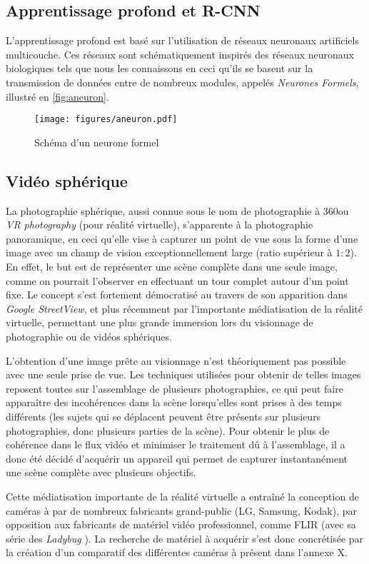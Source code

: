
		\subsection{Apprentissage profond et R-CNN}

			L'apprentissage profond est basé sur l'utilisation de réseaux neuronaux artificiels multicouche. Ces réseaux sont schématiquement inspirés des réseaux neuronaux biologiques tels que nous les connaissons en ceci qu'ils se basent sur la transmission de données entre de nombreux modules, appelés \emph{Neurones Formels}, illustré en \autoref{fig:aneuron}.
			\begin{figure}[h]
			{
				\centering
				\texttt{[image: figures/aneuron.pdf]}
				\caption{Schéma d'un neurone formel}
				\label{fig:aneuron}
			}
			\end{figure}
			
			

		\subsection{Vidéo sphérique}
			La photographie sphérique, aussi connue sous le nom de photographie à 360\degre ou \emph{VR photography} (pour réalité virtuelle), s'apparente à la photographie panoramique, en ceci qu'elle vise à capturer un point de vue sous la forme d'une image avec un champ de vision exceptionnellement large (ratio supérieur à $1:2$)\cite{fnumpano}. En effet, le but est de représenter une scène complète dans une seule image, comme on pourrait l'observer en effectuant un tour complet autour d'un point fixe. Le concept s'est fortement démocratisé au travers de son apparition dans \emph{Google StreetView}, et plus récemment par l'importante médiatisation de la réalité virtuelle, permettant une plus grande immersion lors du visionnage de photographie ou de vidéos sphériques.
			\par
			L'obtention d'une image prête au visionnage n'est théoriquement pas possible avec une seule prise de vue. Les techniques utilisées pour obtenir de telles images reposent toutes sur l'assemblage de plusieurs photographies, ce qui peut faire apparaître des incohérences dans la scène lorsqu'elles sont prises à des temps différents (les sujets qui se déplacent peuvent être présents sur plusieurs photographies, donc plusieurs parties de la scène). Pour obtenir le plus de cohérence dans le flux vidéo et minimiser le traitement dû à l'assemblage, il a donc été décidé d'acquérir un appareil qui permet de capturer instantanément une scène complète avec plusieurs objectifs.
			\par
			Cette médiatisation importante de la réalité virtuelle a entraîné la conception de caméras à \degre par de nombreux fabricants grand-public (LG, Samsung, Kodak), par opposition aux fabricants de matériel vidéo professionnel, comme FLIR (avec sa série des \emph{Ladybug} \cite{ladybug}). La recherche de matériel à acquérir s'est donc concrétisée par la création d'un comparatif des différentes caméras à \degre présent dans l'annexe X.
			
